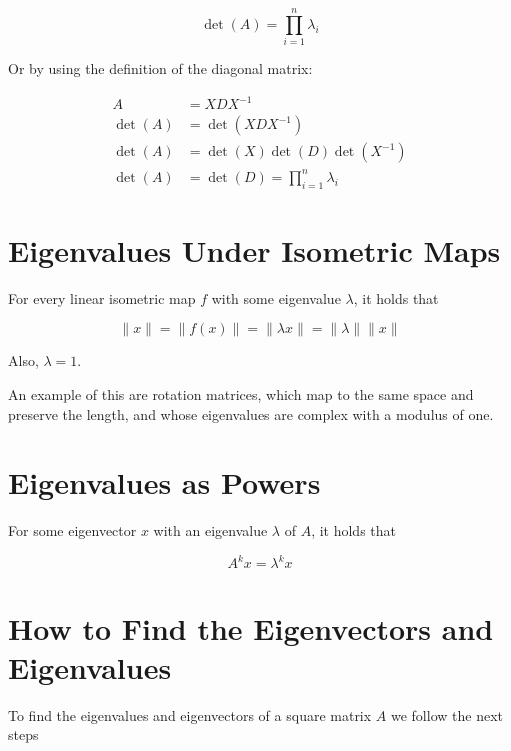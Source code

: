 \[
    \det(A) = \prod_{i = 1}^{n} \lambda_i
\]

Or by using the definition of the diagonal matrix:

\begin{align*}
    A &= XDX^{-1} \\
   \det(A) &= \det(XDX^{-1})\\
   \det(A) &= \det(X)\det(D)\det(X^{-1})\\
   \det(A) &= \det(D) = \prod_{i = 1}^{n} \lambda_i
\end{align*}

\QED

\section{Eigenvalues Under Isometric Maps}

For every linear isometric map \(f\) with some eigenvalue \(\lambda\), it holds that

\[
    \|x\| = \|f(x)\| = \|\lambda x\| = \|\lambda\|\|x\|
\]

Also, \(\lambda = 1\).

An example of this are rotation matrices, which map to the same space and preserve the length, and 
whose eigenvalues are complex with a modulus of one.

\section{Eigenvalues as Powers}

For some eigenvector \(x\) with an eigenvalue \(\lambda\) of \(A\), it holds that

\[
    A^{k}x = \lambda^{k}x
\]

\section{How to Find the Eigenvectors and Eigenvalues}

To find the eigenvalues and eigenvectors of a square matrix \(A\) we follow the next steps 

